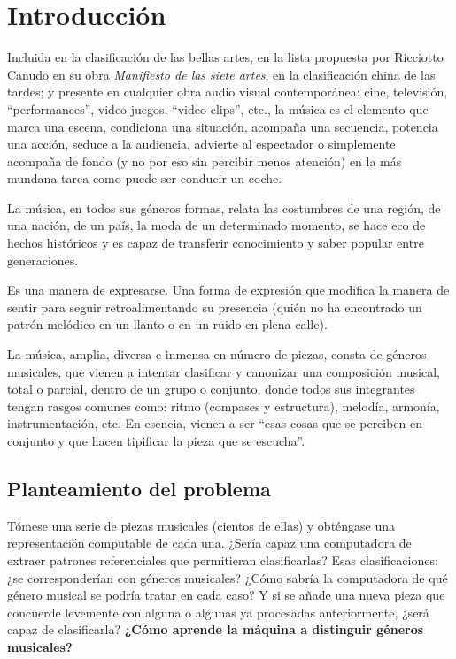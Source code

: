 
\cleardoublepage

\chapter{Introducción}
\label{introduccion}

Incluida en la clasificación de las bellas artes, en la lista propuesta por Ricciotto Canudo en su obra \emph{Manifiesto de las siete artes}, en la clasificación china de las tardes; y presente en cualquier obra audio visual contemporánea: cine, televisión, ``performances'', video juegos, ``video clips'', etc., la música es el elemento que marca una escena, condiciona una situación, acompaña una secuencia, potencia una acción, seduce a la audiencia, advierte al espectador o simplemente acompaña de fondo (y no por eso sin percibir menos atención) en la más mundana tarea como puede ser conducir un coche.

La música, en todos sus géneros formas, relata las costumbres de una región, de una nación, de un país, la moda de un determinado momento, se hace eco de hechos históricos y es capaz de transferir conocimiento y saber popular entre generaciones.

Es una manera de expresarse. Una forma de expresión que modifica la manera de sentir para seguir retroalimentando su presencia (quién no ha encontrado un patrón melódico en un llanto o en un ruido en plena calle).

La música, amplia, diversa e inmensa en número de piezas, consta de géneros musicales, que vienen a intentar clasificar y canonizar una composición musical, total o parcial, dentro de un grupo o conjunto, donde todos sus integrantes tengan rasgos comunes como: ritmo (compases y estructura), melodía, armonía, instrumentación, etc. En esencia, vienen a ser ``esas cosas que se perciben en conjunto y que hacen tipificar la pieza que se escucha''.

\section{Planteamiento del problema}

Tómese una serie de piezas musicales (cientos de ellas) y obténgase una representación computable de cada una. ¿Sería capaz una computadora de extraer patrones referenciales que permitieran clasificarlas? Esas clasificaciones: ¿se corresponderían con géneros musicales? ¿Cómo sabría la computadora de qué género musical se podría tratar en cada caso? Y si se añade una nueva pieza que concuerde levemente con alguna o algunas ya procesadas anteriormente, ¿será capaz de clasificarla? \textbf{¿Cómo aprende la máquina a distinguir géneros musicales?}

